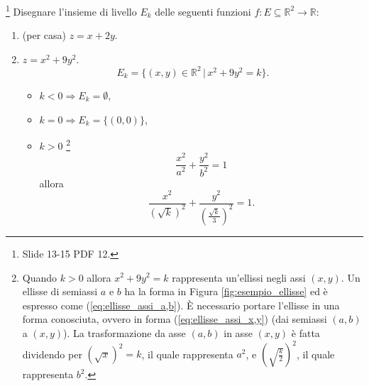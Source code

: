 \begin{example}\footnote{Slide 13-15 PDF 12.}
    Disegnare l'insieme di livello $E_k$ delle seguenti funzioni $f\colon E\subseteq\mathbb R^2\rightarrow\mathbb R$:
    \begin{enumerate}
        \item (per casa) $z=x+2y$.
        \item $z=x^2+9y^2$.
        \begin{equation*}
            E_k=\{(x,y)\in\mathbb R^2\,|\,x^2+9y^2=k\}.
        \end{equation*}
        \begin{itemize}
            \item $k<0\Longrightarrow E_k=\emptyset$,
            \item $k=0 \Longrightarrow E_k=\{(0,0)\}$,
            \item $k>0$ \footnote{Quando $k>0$ allora $x^2+9y^2=k$ rappresenta un'ellissi negli assi $(x,y)$. Un ellisse di semiassi $a$ e $b$ ha la forma in Figura \ref{fig:esempio_ellisse} ed è espresso come (\ref{eq:ellisse_assi_a,b}). È necessario portare l'ellisse in una forma conosciuta, ovvero in forma (\ref{eq:ellisse_assi_x,y}) (dai semiassi $(a,b)$ a $(x,y)$). La trasformazione da asse $(a,b)$ in asse $(x,y)$ è fatta  dividendo per $(\sqrt{x})^2=k$, il quale rappresenta $a^2$, e $\left(\sqrt{\frac{k}{2}}\right)^2$, il quale rappresenta $b^2$.} 
            \begin{equation}\label{eq:ellisse_assi_a,b}
                \frac{x^2}{a^2}+\frac{y^2}{b^2}=1
            \end{equation}
            allora
            \begin{equation}\label{eq:ellisse_assi_x,y}
                \frac{x^2}{\left(\sqrt{k}\right)^2}+\frac{y^2}{\left(\frac{\sqrt{k}}{3}\right)^2}=1.
            \end{equation}
            \begin{figure}
            \centering
\end{figure}
\end{itemize}
\end{enumerate}
\end{example}
